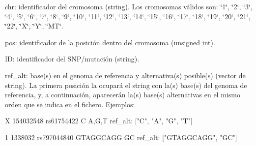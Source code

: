 \begin{DoxyItemize}
\item chr\+: identificador del cromosoma (string). Los cromosomas válidos son\+: \char`\"{}1\char`\"{}, \char`\"{}2\char`\"{}, \char`\"{}3\char`\"{}, \char`\"{}4\char`\"{}, \char`\"{}5\char`\"{}, \char`\"{}6\char`\"{}, \char`\"{}7\char`\"{}, \char`\"{}8\char`\"{}, \char`\"{}9\char`\"{}, \char`\"{}10\char`\"{}, \char`\"{}11\char`\"{}, \char`\"{}12\char`\"{}, \char`\"{}13\char`\"{}, \char`\"{}14\char`\"{}, \char`\"{}15\char`\"{}, \char`\"{}16\char`\"{}, \char`\"{}17\char`\"{}, \char`\"{}18\char`\"{}, \char`\"{}19\char`\"{}, \char`\"{}20\char`\"{}, \char`\"{}21\char`\"{}, \char`\"{}22\char`\"{}, \char`\"{}\+X\char`\"{}, \char`\"{}\+Y\char`\"{}, \char`\"{}\+M\+T\char`\"{}. \item pos\+: identificador de la posición dentro del cromosoma (unsigned int). \item ID\+: identificador del S\+N\+P/mutación (string). \item ref\+\_\+alt\+: base(s) en el genoma de referencia y alternativa(s) posible(s) (vector de string). La primera posición la ocupará el string con la(s) base(s) del genoma de referencia, y, a continuación, aparecerán la(s) base(s) alternativas en el mismo orden que se indica en el fichero. Ejemplos\+: 
\begin{DoxyCode}
X 154032548 rs61754422  C A,G,T
ref\_alt: [\textcolor{stringliteral}{"C"}, \textcolor{stringliteral}{"A"}, \textcolor{stringliteral}{"G"}, \textcolor{stringliteral}{"T"}]

1 1338032 rs797044840 GTAGGCAGG GC
ref\_alt: [\textcolor{stringliteral}{"GTAGGCAGG"}, \textcolor{stringliteral}{"GC"}]
\end{DoxyCode}
\end{DoxyItemize}
